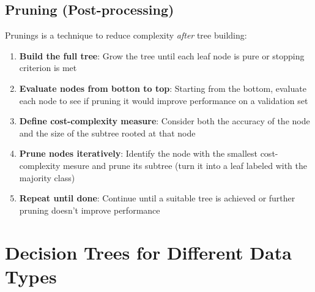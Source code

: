 \documentclass[a4paper]{article}
\theoremstyle{definition}
\begin{document}
\subsection{Pruning (Post-processing)}
Prunings is a technique to reduce complexity \textit{after} tree building:
\begin{enumerate}
    \item \textbf{Build the full tree}: Grow the tree until each leaf node is pure or stopping criterion is met 
    \item \textbf{Evaluate nodes from botton to top}: Starting from the bottom, evaluate each node to see if pruning it would improve performance on a validation set 
    \item \textbf{Define cost-complexity measure}: Consider both the accuracy of the node and the size of the subtree rooted at that node
    \item \textbf{Prune nodes iteratively}: Identify the node with the smallest cost-complexity mesure and prune its subtree (turn it into a leaf labeled with the majority class)
    \item \textbf{Repeat until done}: Continue until a suitable tree is achieved or further pruning doesn't improve performance
\end{enumerate}
\section{Decision Trees for Different Data Types}
\end{document}
